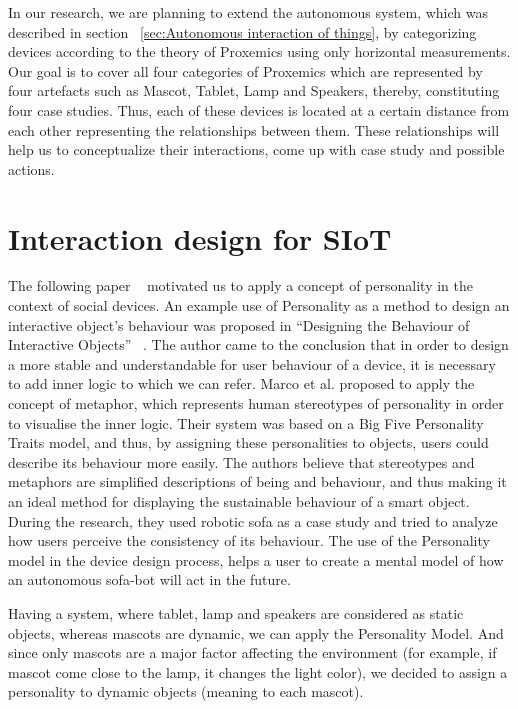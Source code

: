 \par In our research, we are planning to extend the autonomous system, which was described in section ~\ref{sec:Autonomous interaction of things}, by categorizing devices according to the theory of Proxemics using only horizontal measurements. Our goal is to cover all four categories of Proxemics which are represented by four artefacts such as Mascot, Tablet, Lamp and Speakers, thereby, constituting four case studies. Thus, each of these devices is located at a certain distance from each other representing the relationships between them. These relationships will help us to conceptualize their interactions, come up with case study and possible actions.

\section{Interaction design for SIoT}
\label{sec:Interaction design for SIoT}

\par The following paper ~\cite{soro2018social} motivated us to apply a concept of personality in the context of social devices. An example use of Personality as a method to design an interactive object’s behaviour was proposed in “Designing the Behaviour of Interactive Objects” ~\cite{spadafora2016designing}. The author came to the conclusion that in order to design a more stable and understandable for user behaviour of a device, it is necessary to add inner logic to which we can refer. Marco et al. proposed to apply the concept of metaphor, which represents human stereotypes of personality in order to visualise the inner logic. Their system was based on a Big Five Personality Traits model, and thus, by assigning these personalities to objects, users could describe its behaviour more easily. The authors believe that stereotypes and metaphors are simplified descriptions of being and behaviour, and thus making it an ideal method for displaying the sustainable behaviour of a smart object. During the research, they used robotic sofa as a case study and tried to analyze how users perceive the consistency of its behaviour. The use of the Personality model in the device design process, helps a user to create a mental model of how an autonomous sofa-bot will act in the future.

Having a system, where tablet, lamp and speakers are considered as static objects, whereas mascots are dynamic, we can apply the Personality Model. And since only mascots are a major factor affecting the environment (for example, if mascot come close to the lamp, it changes the light color), we decided to assign a personality to dynamic objects (meaning to each mascot).

